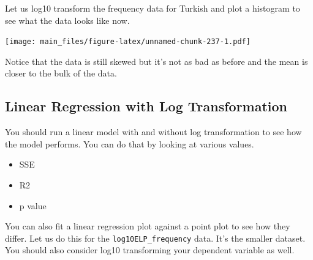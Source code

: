 \documentclass[
]{book}
\newenvironment{Shaded}{\begin{snugshade}}{\end{snugshade}}
\newcommand{\AttributeTok}[1]{\textcolor[rgb]{0.77,0.63,0.00}{#1}}
\newcommand{\CommentTok}[1]{\textcolor[rgb]{0.56,0.35,0.01}{\textit{#1}}}
\newcommand{\DecValTok}[1]{\textcolor[rgb]{0.00,0.00,0.81}{#1}}
\newcommand{\FunctionTok}[1]{\textcolor[rgb]{0.00,0.00,0.00}{#1}}
\newcommand{\NormalTok}[1]{#1}
\newcommand{\OtherTok}[1]{\textcolor[rgb]{0.56,0.35,0.01}{#1}}
\newcommand{\SpecialCharTok}[1]{\textcolor[rgb]{0.00,0.00,0.00}{#1}}
\newcommand{\StringTok}[1]{\textcolor[rgb]{0.31,0.60,0.02}{#1}}
\providecommand{\tightlist}{%
  \setlength{\itemsep}{0pt}\setlength{\parskip}{0pt}}
\begin{document}
Let us log10 transform the frequency data for Turkish and plot a histogram to see what the data looks like now.

\begin{Shaded}
\end{Shaded}

\texttt{[image: main\_files/figure-latex/unnamed-chunk-237-1.pdf]}

Notice that the data is still skewed but it's not as bad as before and the mean is closer to the bulk of the data.

\hypertarget{linear-regression-with-log-transformation}{%
\subsection{Linear Regression with Log Transformation}\label{linear-regression-with-log-transformation}}

You should run a linear model with and without log transformation to see how the model performs. You can do that by looking at various values.

\begin{itemize}
\tightlist
\item
  SSE
\item
  R2
\item
  p value
\end{itemize}

You can also fit a linear regression plot against a point plot to see how they differ. Let us do this for the \texttt{log10ELP\_frequency} data. It's the smaller dataset. You should also consider log10 transforming your dependent variable as well.

  
\end{document}
